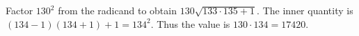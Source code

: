 Factor $130^2$ from the radicand to obtain $130\sqrt{133\cdot135+1}$. The inner quantity is $(134-1)(134+1)+1=134^2$. Thus the value is $130\cdot134=\boxed{17420}$.
